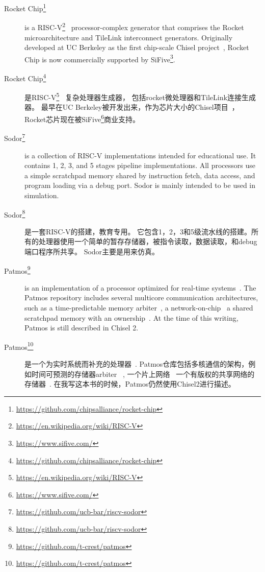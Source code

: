 \documentclass[%
    10pt,
    headinclude, footexclude,
    openright, %
    notitlepage,
    cleardoubleempty,
    headsepline,
    pointlessnumbers,
    bibtotoc, idxtotoc,
    ]{scrbook}
\newcommand{\myref}[2]{\href{#1}{#2}}
\renewcommand{\myref}[2]{{#2}{\footnote{\url{#1}}}}
\begin{document}
{\begin{description}

\item[\myref{https://github.com/chipsalliance/rocket-chip}{Rocket Chip}]
is a \myref{https://en.wikipedia.org/wiki/RISC-V}{RISC-V}~\cite{risc-v}
processor-complex generator that comprises the Rocket
microarchitecture and TileLink interconnect generators.  Originally developed
at UC Berkeley as the first chip-scale Chisel project~\cite{rocket:techrep}, Rocket Chip is now
commercially supported by \myref{https://www.sifive.com/}{SiFive}.

\item[\myref{https://github.com/chipsalliance/rocket-chip}{Rocket Chip}]
是\myref{https://en.wikipedia.org/wiki/RISC-V}{RISC-V}~\cite{risc-v}
复杂处理器生成器， 包括rocket微处理器和TileLink连接生成器。 
最早在UC Berkeley被开发出来，作为芯片大小的Chisel项目~\cite{rocket:techrep}，
Rocket芯片现在被\myref{https://www.sifive.com/}{SiFive}商业支持。


\item[\myref{https://github.com/ucb-bar/riscv-sodor}{Sodor}] is a collection of RISC-V
implementations intended for educational use. It contains 1, 2, 3, and 5 stages pipeline
implementations. All processors use a simple scratchpad memory shared by instruction
fetch, data access, and program loading via a debug port. Sodor is mainly intended to
be used in simulation.

\item[\myref{https://github.com/ucb-bar/riscv-sodor}{Sodor}]是一套RISC-V的搭建，教育专用。
它包含1，2，3和5级流水线的搭建。所有的处理器使用一个简单的暂存存储器，被指令读取，数据读取，和debug端口程序所共享。
Sodor主要是用来仿真。

\item[\myref{https://github.com/t-crest/patmos}{Patmos}] is an implementation of a
processor optimized for real-time systems~\cite{patmos:rts2018}. The Patmos repository
includes several multicore communication architectures, such as a time-predictable memory
arbiter~\cite{t-crest:memnoc}, a network-on-chip~\cite{s4nocni:arcs2019}
a shared scratchpad memory with an ownership~\cite{t-crest:ownspm}.
At the time of this writing, Patmos is still described in Chisel 2.

\item[\myref{https://github.com/t-crest/patmos}{Patmos}] 是一个为实时系统而补充的处理器~\cite{patmos:rts2018}.
Patmos仓库包括多核通信的架构，例如时间可预测的存储器arbiter~\cite{t-crest:memnoc}
, 一个片上网络~\cite{s4nocni:arcs2019}
一个有版权的共享网络的存储器~\cite{t-crest:ownspm}.
在我写这本书的时候，Patmos仍然使用Chisel2进行描述。


\end{description}}
\end{document}
